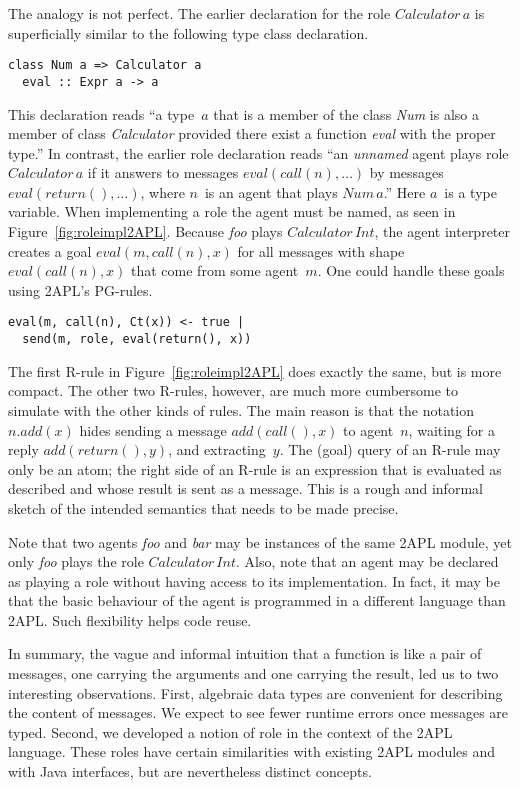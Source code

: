 \documentclass[conference,compsoc]{IEEEtran} %
\begin{document}
The analogy is not perfect. The earlier declaration for the role
$\mathit{Calculator}\,a$ is superficially similar to the following type
class declaration.
\begin{lstlisting}[style=hs]
class Num a => Calculator a
  eval :: Expr a -> a
\end{lstlisting}
This declaration reads ``a type~$a$ that is a member of the class
\textit{Num} is also a member of class \textit{Calculator} provided there
exist a function \textit{eval} with the proper type.'' In contrast, the
earlier role declaration reads ``an \emph{unnamed} agent plays role
$\mathit{Calculator}\,a$ if it answers to messages
$\mathit{eval}(\mathit{call}(n),\ldots)$ by messages
$\mathit{eval}(\mathit{return}(),\ldots)$, where $n$~is an agent that plays
$\mathit{Num}\,a$.'' Here $a$~is a type variable.  When implementing a role
the agent must be named, as seen in Figure~\ref{fig:roleimpl2APL}. Because
\textit{foo} plays $\mathit{Calculator}\,\mathit{Int}$, the agent
interpreter creates a goal $\mathit{eval}(m,\mathit{call}(n),x)$ for all
messages with shape $\mathit{eval}(\mathit{call}(n),x)$ that come from some
agent~$m$.  One could handle these goals using 2APL's PG-rules.
\begin{lstlisting}[style=me]
eval(m, call(n), Ct(x)) <- true |
  send(m, role, eval(return(), x))
\end{lstlisting}
The first R-rule in Figure~\ref{fig:roleimpl2APL} does exactly the same,
but is more compact. The other two R-rules, however, are much more
cumbersome to simulate with the other kinds of rules. The main reason is
that the notation $n.\mathit{add}(x)$ hides sending a message
$\mathit{add}(\mathit{call}(),x)$ to agent~$n$, waiting for a reply
$\mathit{add}(\mathit{return}(),y)$, and extracting~$y$. The (goal) query
of an R-rule may only be an atom; the right side of an R-rule is an
expression that is evaluated as described and whose result is sent as a
message.  This is a rough and informal sketch of the intended semantics
that needs to be made precise.

Note that two agents \textit{foo} and \textit{bar} may be instances of the
same 2APL module, yet only \textit{foo} plays the role
$\mathit{Calculator}\,\mathit{Int}$. Also, note that an agent may be
declared as playing a role without having access to its implementation. In
fact, it may be that the basic behaviour of the agent is programmed in a
different language than 2APL. Such flexibility helps code reuse.

In summary, the vague and informal intuition that a function is like a pair
of messages, one carrying the arguments and one carrying the result, led us
to two interesting observations. First, algebraic data types are convenient
for describing the content of messages. We expect to see fewer runtime
errors once messages are typed. Second, we developed a notion of role in
the context of the 2APL language. These roles have certain similarities
with existing 2APL modules and with Java interfaces, but are nevertheless
distinct concepts.
\end{document}
